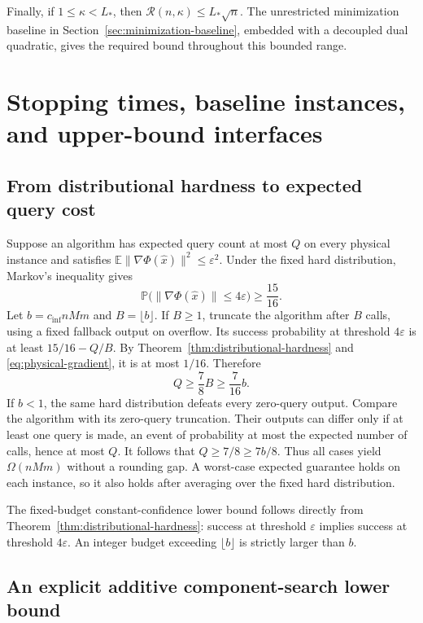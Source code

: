 \documentclass[11pt,letterpaper]{article}
\theoremstyle{definition}
\theoremstyle{remark}
\newcommand{\E}{\mathbb E}
\newcommand{\PP}{\mathbb P}
\newcommand{\cR}{\mathcal R}
\begin{document}
Finally, if $1\le\kappa<L_*$, then
$\cR(n,\kappa)\le L_*\sqrt n$. The unrestricted minimization baseline in
Section~\ref{sec:minimization-baseline}, embedded with a decoupled dual
quadratic, gives the required bound throughout this bounded range.

\section{Stopping times, baseline instances, and upper-bound interfaces}
\label{app:protocols}

\subsection{From distributional hardness to expected query cost}
\label{sec:expected-lower}

Suppose an algorithm has expected query count at most $Q$ on every physical
instance and satisfies
$\E\|\nabla\Phi(\widehat x)\|^2\le\varepsilon^2$.
Under the fixed hard distribution, Markov's inequality gives
\[
 \PP\bigl(\|\nabla\Phi(\widehat x)\|\le4\varepsilon\bigr)
 \ge\frac{15}{16}.
\]
Let $b=c_{\mathrm{inf}}nMm$ and $B=\lfloor b\rfloor$. If $B\ge1$,
truncate the algorithm after $B$ calls, using a fixed fallback output on
overflow. Its success probability at threshold $4\varepsilon$ is at least
$15/16-Q/B$. By Theorem~\ref{thm:distributional-hardness} and
\eqref{eq:physical-gradient}, it is at most $1/16$. Therefore
\[
 Q\ge\frac78B\ge\frac7{16}b.
\]
If $b<1$, the same hard distribution defeats every zero-query output.
Compare the algorithm with its zero-query truncation. Their outputs can
differ only if at least one query is made, an event of probability at most
the expected number of calls, hence at most $Q$. It follows that
$Q\ge7/8\ge7b/8$. Thus all cases yield $\Omega(nMm)$ without a rounding
gap. A worst-case expected guarantee holds on each instance, so it also
holds after averaging over the fixed hard distribution.

The fixed-budget constant-confidence lower bound follows directly from
Theorem~\ref{thm:distributional-hardness}: success at threshold
$\varepsilon$ implies success at threshold $4\varepsilon$. An integer
budget exceeding $\lfloor b\rfloor$ is strictly larger than $b$.

\subsection{An explicit additive component-search lower bound}
\label{sec:search-lower}
\end{document}
